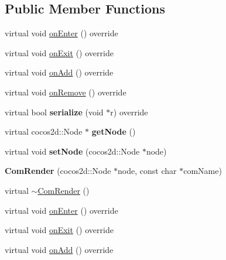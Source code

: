 \subsection*{Public Member Functions}
\begin{DoxyCompactItemize}
\item 
virtual void \hyperlink{classcocostudio_1_1ComRender_a1dfb341e746fd6f62a1bbd50b2431688}{on\+Enter} () override
\item 
virtual void \hyperlink{classcocostudio_1_1ComRender_a7cc7921b00201422372031c9253243ca}{on\+Exit} () override
\item 
virtual void \hyperlink{classcocostudio_1_1ComRender_ac6e2b84f901881953325054e98c556fb}{on\+Add} () override
\item 
virtual void \hyperlink{classcocostudio_1_1ComRender_aa63829f9910964663309a5f43598e2b0}{on\+Remove} () override
\item 
\mbox{\label{classcocostudio_1_1ComRender_a636f63801837d28858fcfa529ec9b414}} 
virtual bool {\bfseries serialize} (void $\ast$r) override
\item 
\mbox{\label{classcocostudio_1_1ComRender_a79ae1817107675b1456823e65664557b}} 
virtual cocos2d\+::\+Node $\ast$ {\bfseries get\+Node} ()
\item 
\mbox{\label{classcocostudio_1_1ComRender_a74317e8c4d9008e89b2ec104e8329fdd}} 
virtual void {\bfseries set\+Node} (cocos2d\+::\+Node $\ast$node)
\item 
\mbox{\label{classcocostudio_1_1ComRender_a6955dcd1ab91ca9713980ebe7b810b34}} 
{\bfseries Com\+Render} (cocos2d\+::\+Node $\ast$node, const char $\ast$com\+Name)
\item 
virtual \hyperlink{classcocostudio_1_1ComRender_ae223793e939c371c4957db61d2fbe639}{$\sim$\+Com\+Render} ()
\item 
virtual void \hyperlink{classcocostudio_1_1ComRender_aa43953d6279e52cad65edef2ac7509fb}{on\+Enter} () override
\item 
virtual void \hyperlink{classcocostudio_1_1ComRender_a1887e3d66d1d42beba6a770f1508effa}{on\+Exit} () override
\item 
virtual void \hyperlink{classcocostudio_1_1ComRender_a02b72abc0f255a015f762df2e2197651}{on\+Add} () override
\item 

\end{DoxyCompactItemize}
